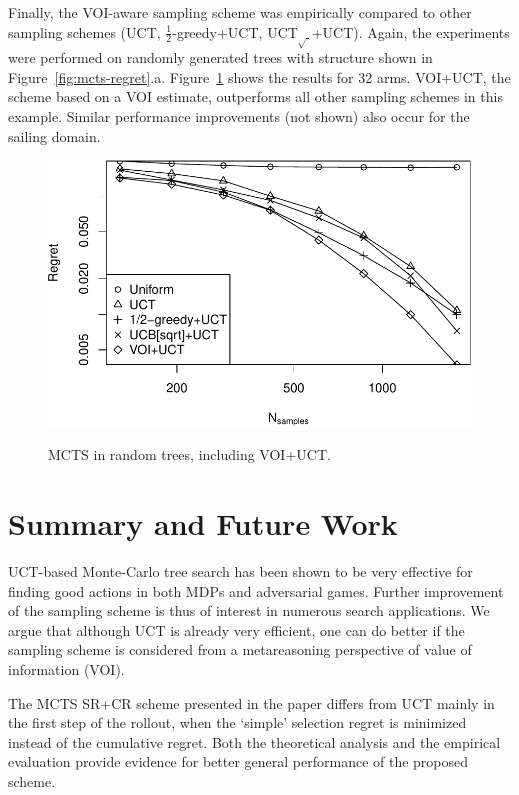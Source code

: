 \documentclass[letterpaper]{article}
\begin{document}
Finally, the VOI-aware sampling scheme was empirically compared to
other sampling schemes (UCT, $\frac 1 2$-greedy+UCT,
UCT$_{\sqrt{\cdot}}$+UCT). Again, the experiments were performed on
randomly generated trees with structure shown in
Figure~\ref{fig:mcts-regret}.a. Figure~\ref{fig:mcts-regret-voi} shows
the results for 32 arms. VOI+UCT, the scheme based on a VOI estimate,
outperforms all other sampling schemes in this example. Similar performance improvements
(not shown) also occur for the sailing domain.
\begin{figure}[h!]
  \centering
  \includegraphics[scale=0.45]{tree-identity-k=32-uqb=8+voi.pdf}\\
  \caption{MCTS in random trees, including VOI+UCT.}
  \label{fig:mcts-regret-voi} 
  \vspace{-1.5em}
\end{figure}

\section{Summary and Future Work}
\label{sec:summary}

UCT-based Monte-Carlo tree search has been shown to be very effective
for finding good actions in both MDPs and adversarial games.
Further improvement of the sampling scheme is thus of interest in
numerous search applications. We argue that although UCT is already very efficient,
one can do better if the sampling scheme is considered from a metareasoning
perspective of value of information (VOI).

The MCTS SR+CR scheme presented in the paper differs
from UCT mainly in the first step of the rollout, when the `simple' selection
regret is minimized instead of the cumulative regret. Both the
theoretical analysis and the empirical evaluation provide evidence for
better general performance of the proposed scheme.
\end{document}
